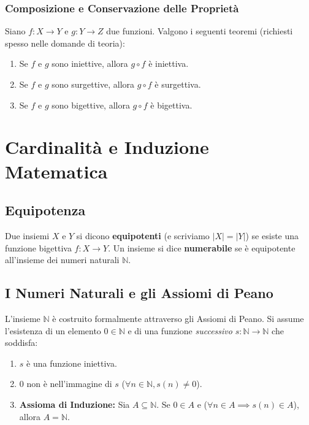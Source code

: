 \documentclass[12pt, a4paper]{article}
\begin{document}
\subsubsection{Composizione e Conservazione delle Proprietà}
Siano $f: X \to Y$ e $g: Y \to Z$ due funzioni. Valgono i seguenti teoremi (richiesti spesso nelle domande di teoria):
\begin{enumerate}
    \item Se $f$ e $g$ sono iniettive, allora $g \circ f$ è iniettiva.
    \item Se $f$ e $g$ sono surgettive, allora $g \circ f$ è surgettiva.
    \item Se $f$ e $g$ sono bigettive, allora $g \circ f$ è bigettiva.
\end{enumerate}

\section{Cardinalità e Induzione Matematica}

\subsection{Equipotenza}
Due insiemi $X$ e $Y$ si dicono \textbf{equipotenti} (e scriviamo $|X| = |Y|$) se esiste una funzione bigettiva $f: X \to Y$. 
Un insieme si dice \textbf{numerabile} se è equipotente all'insieme dei numeri naturali $\mathbb{N}$.

\subsection{I Numeri Naturali e gli Assiomi di Peano}
L'insieme $\mathbb{N}$ è costruito formalmente attraverso gli Assiomi di Peano. Si assume l'esistenza di un elemento $0 \in \mathbb{N}$ e di una funzione \emph{successivo} $s: \mathbb{N} \to \mathbb{N}$ che soddisfa:
\begin{enumerate}[label=P\arabic*)]
    \item $s$ è una funzione iniettiva.
    \item $0$ non è nell'immagine di $s$ ($\forall n \in \mathbb{N}, s(n) \neq 0$).
    \item \textbf{Assioma di Induzione:} Sia $A \subseteq \mathbb{N}$. Se $0 \in A$ e ($\forall n \in A \implies s(n) \in A$), allora $A = \mathbb{N}$.
\end{enumerate}
\end{document}
